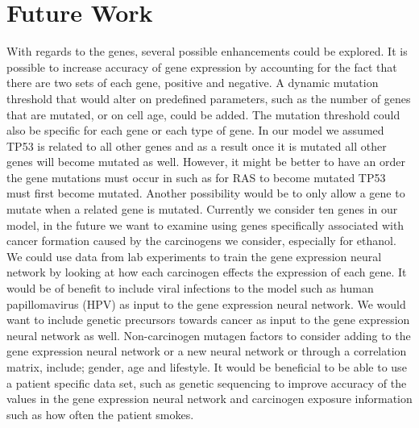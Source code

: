 \documentclass[\main/thesis.tex]{subfiles}
\begin{document}
\section{Future Work}
With regards to the genes, several possible enhancements could be explored. It is possible to increase accuracy of gene expression by accounting for the fact that there are two sets of each gene, positive and negative. A dynamic mutation threshold that would alter on predefined parameters, such as the number of genes that are mutated, or on cell age, could be added. The mutation threshold could also be specific for each gene or each type of gene. In our model we assumed TP53 is related to all other genes and as a result once it is mutated all other genes will become mutated as well. However, it might be better to have an order the gene mutations must occur in such as for RAS to become mutated TP53 must first become mutated. Another possibility would be to only allow a gene to mutate when a related gene is mutated. Currently we consider ten genes in our model, in the future we want to examine using genes specifically associated with cancer formation caused by the carcinogens we consider, especially for ethanol. We could use data from lab experiments to train the gene expression neural network by looking at how each carcinogen effects the expression of each gene. It would be of benefit to include viral infections to the model such as human papillomavirus (HPV) as input to the gene expression neural network. We would want to include genetic precursors towards cancer as input to the gene expression neural network as well. Non-carcinogen mutagen factors to consider adding to the gene expression neural network or a new neural network or through a correlation matrix, include; gender, age and lifestyle. It would be beneficial to be able to use a patient specific data set, such as genetic sequencing to improve accuracy of the values in the gene expression neural network and carcinogen exposure information such as how often the patient smokes. 
\end{document}
